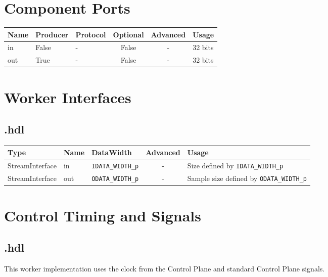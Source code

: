\begin{landscape}
	\section*{Component Ports}
	\begin{scriptsize}
		\begin{tabular}{|M{2cm}|M{1.5cm}|M{4cm}|c|c|M{9cm}|}
			\hline
			Name & Producer & Protocol & Optional & Advanced & Usage                                  \\
			\hline
			in   & False    & -        & False    & -        & 32 bits                            \\
			\hline
			out  & True     & -        & False    & -        & 32 bits \\
			\hline
		\end{tabular}
	\end{scriptsize}

	\section*{Worker Interfaces}
	\subsection*{\comp.hdl}
	\begin{scriptsize}
		\begin{tabular}{|M{2cm}|M{1.5cm}|M{4cm}|c|M{12cm}|}
			\hline
			\rowcolor{blue}
			Type            & Name & DataWidth            & Advanced & Usage                                       \\
			\hline
			StreamInterface & in   & \verb+IDATA_WIDTH_p+ & -        & Size defined by \verb+IDATA_WIDTH_p+        \\
			\hline
			StreamInterface & out  & \verb+ODATA_WIDTH_p+ & -        & Sample size defined by \verb+ODATA_WIDTH_p+ \\
			\hline
		\end{tabular}
	\end{scriptsize}
\end{landscape}

\section*{Control Timing and Signals}
\subsection*{\comp.hdl}
\begin{flushleft}
	This worker implementation uses the clock from the Control Plane and standard Control Plane signals.
\end{flushleft}

